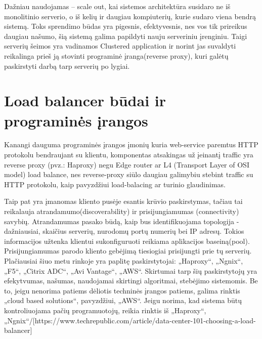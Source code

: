 \documentclass{VUMIFPSkursinis}
\begin{document}
Dažniau naudojamas – scale out, kai sistemos architektūra susidaro ne iš monolitinio serverio, o iš kelių ir daugiau kompiuterių, kurie sudaro viena bendrą sistemą. Toks sprendimo būdas yra pigesnis, efektyvesnis, nes vos tik prireikus daugiau našumo, šią sistemą galima papildyti nauju serveriniu įrenginiu. Taigi serverių šeimos yra vadinamos Clustered application ir norint jas suvaldyti reikalinga prieš ją stovinti programinė įranga(reverse proxy), kuri galėtų paskirstyti darbą tarp serverių po lygiai.

\section{Load balancer būdai ir programinės įrangos}
Kanangi dauguma programinės įrangos įmonių kuria web-service paremtus HTTP protokolu bendraujant su klientu, komponentas atsakingas už įeinantį traffic yra reverse proxy (pvz.: Haproxy) negu Edge router ar L4 (Transport Layer of OSI model) load balance, nes reverse-proxy siūlo daugiau galimybiu stebint traffic su HTTP protokolu, kaip pavyzdžiui load-balacing ar turinio glaudinimas.

Taip pat yra įmanomas kliento pusėje esantis krūvio paskirstymas, tačiau tai reikalauja atrandamumo(discoverability) ir prisijungiamumas (connectivity) savybių. Atrandamumas pasako būdą, kaip bus identifikuojama topologija - dažniausiai, skaičius serverių, nurodomų portų numerių bei IP adresų. Tokios informacijos užtenka klientui sukonfiguruoti reikiama aplikacijos baseiną(pool). Prisijungiamumas parodo kliento gebėjimą tiesiogiai prisijungti prie tų serverių.
Plačiausiai šiuo metu rinkoje yra paplitę paskirstytojai: „Haproxy“, „Ngnix“, „F5“, „Citrix ADC“, „Avi Vantage“, „AWS“. Skirtumai tarp šių paskirstytojų yra efekytvumas, našumas, naudojamai skirtingi algoritmai, stebėjimo sistemomis. Be to, jeigu nenorima patiems dėliotis techninės įrangos patiems, galima rinktis „cloud based solutions“, pavyzdžiui, „AWS“. Jeigu norima, kad sistema būtų kontroliuojama pačių programuotojų, reikia rinktis iš „Haproxy“, „Ngnix“/[https://www.techrepublic.com/article/data-center-101-choosing-a-load-balancer]
\end{document}
